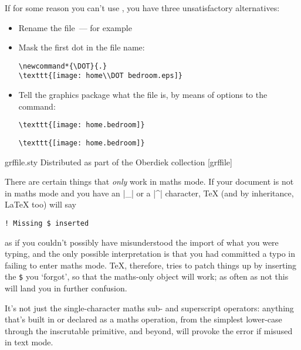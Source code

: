 {If for some reason you can't use , you have three
unsatisfactory alternatives:
\begin{itemize}
\item Rename the file~--- for example \arrowhyph{}%
\item Mask the first dot in the file name:
\begin{verbatim}
\newcommand*{\DOT}{.}
\texttt{[image: home\\DOT bedroom.eps]}
\end{verbatim}
\item Tell the graphics package what the file is, by means of options
  to the  command:
\begin{narrowversion}
\begin{verbatim}
\texttt{[image: home.bedroom]}
\end{verbatim}
\end{narrowversion}
\begin{wideversion}
\begin{verbatim}
\texttt{[image: home.bedroom]}
\end{verbatim}
\end{wideversion}
\end{itemize}
\begin{ctanrefs}
\item[grffile.sty]Distributed as part of the Oberdiek collection
  [grffile]
\end{ctanrefs}


There are certain things that \emph{only} work in maths mode.  If your
document is not in maths mode and you have an |_| or a |^| character,
\TeX{} (and by inheritance, \LaTeX{} too) will say
\begin{verbatim}
! Missing $ inserted
\end{verbatim}
as if you couldn't possibly have misunderstood the import of what you
were typing, and the only possible interpretation is that you had
committed a typo in failing to enter maths mode.  \TeX{}, therefore,
tries to patch things up by inserting the \texttt{\$} you `forgot', so that
the maths-only object will work; as often as not this will land you in
further confusion.

It's not just the single-character maths sub- and superscript
operators: anything that's built in or declared as a maths operation,
from the simplest lower-case  through the inscrutable
 primitive, and beyond, will provoke the error if
misused in text mode.

}

